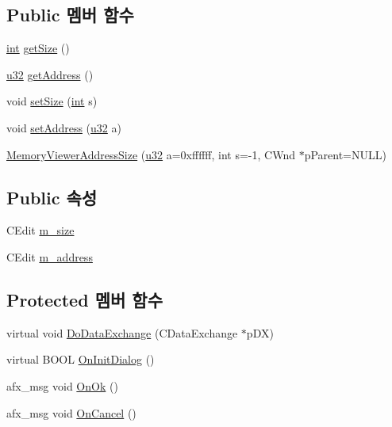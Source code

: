 \subsection*{Public 멤버 함수}
\begin{DoxyCompactItemize}
\item 
\mbox{\hyperlink{_util_8cpp_a0ef32aa8672df19503a49fab2d0c8071}{int}} \mbox{\hyperlink{class_memory_viewer_address_size_ade3cfceb89cd35954e57d10dba882eb1}{get\+Size}} ()
\item 
\mbox{\hyperlink{_system_8h_a10e94b422ef0c20dcdec20d31a1f5049}{u32}} \mbox{\hyperlink{class_memory_viewer_address_size_a3d31492056e5b255aa882f7732671c4c}{get\+Address}} ()
\item 
void \mbox{\hyperlink{class_memory_viewer_address_size_a20e77ae46d654fc217b381d6d8aac00d}{set\+Size}} (\mbox{\hyperlink{_util_8cpp_a0ef32aa8672df19503a49fab2d0c8071}{int}} s)
\item 
void \mbox{\hyperlink{class_memory_viewer_address_size_adb284f02039e70a6b0c44e0bacf9feff}{set\+Address}} (\mbox{\hyperlink{_system_8h_a10e94b422ef0c20dcdec20d31a1f5049}{u32}} a)
\item 
\mbox{\hyperlink{class_memory_viewer_address_size_a84ec64f3339841082887f5566ce68d19}{Memory\+Viewer\+Address\+Size}} (\mbox{\hyperlink{_system_8h_a10e94b422ef0c20dcdec20d31a1f5049}{u32}} a=0xffffff, int s=-\/1, C\+Wnd $\ast$p\+Parent=\+N\+U\+L\+L)
\end{DoxyCompactItemize}
\subsection*{Public 속성}
\begin{DoxyCompactItemize}
\item 
C\+Edit \mbox{\hyperlink{class_memory_viewer_address_size_a02bf9c56d2fe4c0edb66f6f26323378e}{m\+\_\+size}}
\item 
C\+Edit \mbox{\hyperlink{class_memory_viewer_address_size_a91998e945a9ebfc2dd2636f75e89d974}{m\+\_\+address}}
\end{DoxyCompactItemize}
\subsection*{Protected 멤버 함수}
\begin{DoxyCompactItemize}
\item 
virtual void \mbox{\hyperlink{class_memory_viewer_address_size_a5b80a5682982a31e25469c1ba9d75ee8}{Do\+Data\+Exchange}} (C\+Data\+Exchange $\ast$p\+DX)
\item 
virtual B\+O\+OL \mbox{\hyperlink{class_memory_viewer_address_size_a986a62d4477f5c2b6d227386803a6b5e}{On\+Init\+Dialog}} ()
\item 
afx\+\_\+msg void \mbox{\hyperlink{class_memory_viewer_address_size_acc7b79baafb3ae6fad9b4ca0b12aa34f}{On\+Ok}} ()
\item 
afx\+\_\+msg void \mbox{\hyperlink{class_memory_viewer_address_size_af05210504fe10d13c328d7d953da28d8}{On\+Cancel}} ()
\end{DoxyCompactItemize}


